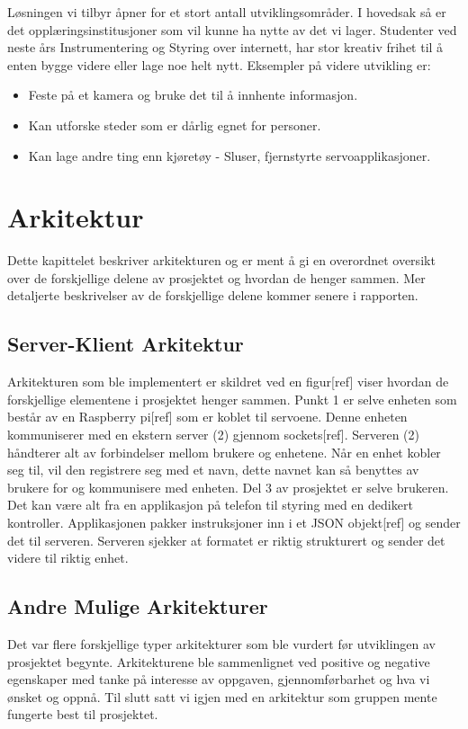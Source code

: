 \documentclass[12pt]{report}
\begin{document}
Løsningen vi tilbyr åpner for et stort antall utviklingsområder. I hovedsak så er det opplæringsinstitusjoner som vil kunne ha nytte av det vi lager. Studenter ved neste års Instrumentering og Styring over internett, har stor kreativ frihet til å enten bygge videre eller lage noe helt nytt. Eksempler på videre utvikling er:

\begin{itemize}
	\item Feste på et kamera og bruke det til å innhente informasjon.
	\item Kan utforske steder som er dårlig egnet for personer.
	\item Kan lage andre ting enn kjøretøy - Sluser, fjernstyrte servoapplikasjoner.
\end{itemize}

\clearpage

\chapter{Arkitektur}
Dette kapittelet beskriver arkitekturen og er ment å gi en overordnet oversikt over de forskjellige delene av prosjektet og hvordan de henger sammen. Mer detaljerte beskrivelser av de forskjellige delene kommer senere i rapporten.

\section{Server-Klient Arkitektur}
Arkitekturen som ble implementert er skildret ved en figur[ref] viser hvordan de forskjellige elementene i prosjektet henger sammen. Punkt 1 er selve enheten som består av en Raspberry pi[ref] som er koblet til servoene. Denne enheten kommuniserer med en ekstern server (2) gjennom sockets[ref]. Serveren (2) håndterer alt av forbindelser mellom brukere og enhetene. Når en enhet kobler seg til, vil den registrere seg med et navn, dette navnet kan så benyttes av brukere for og kommunisere med enheten. Del 3 av prosjektet er selve brukeren. Det kan være alt fra en applikasjon på telefon til styring med en dedikert kontroller. Applikasjonen pakker instruksjoner inn i et JSON objekt[ref] og sender det til serveren. Serveren sjekker at formatet er riktig strukturert og sender det videre til riktig enhet.

\section{Andre Mulige Arkitekturer}
Det var flere forskjellige typer arkitekturer som ble vurdert før utviklingen av prosjektet begynte. Arkitekturene ble sammenlignet ved positive og negative egenskaper med tanke på interesse av oppgaven, gjennomførbarhet og hva vi ønsket og oppnå. Til slutt satt vi igjen med en arkitektur som gruppen mente fungerte best til prosjektet.
\end{document}
